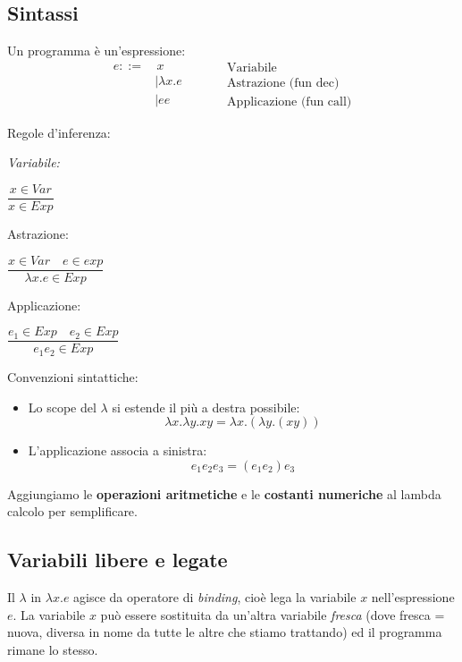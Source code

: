 \documentclass[a4paper,10pt]{article}
\begin{document}
\subsection{Sintassi}
Un programma è un'espressione:
\[ \begin{aligned}
        e::= & \,x \\&| \lambda x.e \\&| e e
        \end{aligned}\quad\quad
    \begin{aligned}
     &\text{Variabile}\\ &\text{Astrazione (fun dec)}\\ &\text{Applicazione (fun call)} 
    \end{aligned}
 \]

 Regole d'inferenza: 
 \begin{multicols}{3}
 \centering
 \it Variabile:\bigskip
 
 $ \dfrac{x \in Var}{x \in Exp} $
 
 Astrazione:\bigskip
 
 $ \dfrac{x \in Var \quad e \in exp}{\lambda x.e \in Exp} $
 
 Applicazione:\bigskip
 
 $\dfrac{e_1 \in Exp \quad e_2 \in Exp}{e_1e_2 \in Exp}$
 \end{multicols}

Convenzioni sintattiche:
\begin{multicols}{2}
 
\begin{itemize}
 \item Lo scope del $\lambda$ si estende il più a destra possibile: 
 \[\lambda x .\lambda y.xy = \lambda x.(\lambda y.(xy))\]
 \item L'applicazione associa a sinistra: \[e_1e_2e_3 = (e_1e_2)e_3\]
\end{itemize}
\end{multicols}

Aggiungiamo le \textbf{operazioni aritmetiche} e le \textbf{costanti numeriche} al lambda calcolo per semplificare.
 
\subsection{Variabili libere e legate}
Il $\lambda$ in $\lambda x.e$ agisce da operatore di \emph{binding}, cioè lega la variabile $x$ nell'espressione $e$. La variabile $x$ può essere sostituita da un'altra variabile \emph{fresca} (dove fresca = nuova, diversa in nome da tutte le altre che stiamo trattando) ed il programma rimane lo stesso. \bigskip
\end{document}
